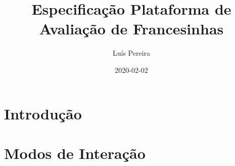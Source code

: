 \documentclass[12pt]{article}
\title{Especificação Plataforma de Avaliação de Francesinhas}
\date{2020-02-02}
\author{Luís Pereira}
\begin{document}
	\maketitle
	\newpage

	\section{Introdução}
	
	\section{Modos de Interação}
\end{document}

